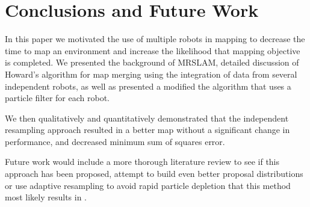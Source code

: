 \section{Conclusions and Future Work}

In this paper we motivated the use of multiple robots in mapping to decrease the time to map an environment and increase the likelihood that mapping objective is completed.  We presented the background of MRSLAM, detailed discussion of Howard’s algorithm \cite{howard2006multi} for map merging using the integration of data from several independent robots, as well as presented a modified the algorithm that uses a particle filter for each robot.  

We then qualitatively and quantitatively demonstrated that the independent resampling approach resulted in a better map without a significant change in performance, and decreased minimum sum of squares error.

Future work would include a more thorough literature review to see if this approach has been proposed, attempt to build even better proposal distributions or use adaptive resampling to avoid rapid particle depletion that this method most likely results in \cite{Grisetti2007}.

